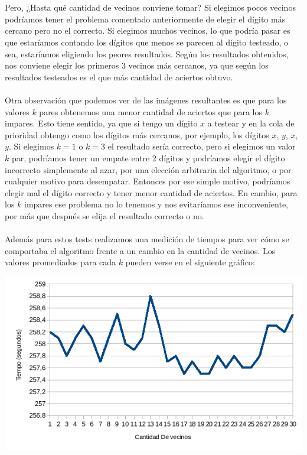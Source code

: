 \\ \\
Pero, ¿Hasta qué cantidad de vecinos conviene tomar?
Si elegimos pocos vecinos podríamos tener el problema comentado anteriormente de elegir el dígito más cercano pero no el correcto.
Si elegimos muchos vecinos, lo que podría pasar es que estaríamos contando los dígitos que menos se parecen al dígito testeado, o sea, estaríamos eligiendo los peores resultados.
Según los resultados obtenidos, nos conviene elegir los primeros 3 vecinos más cercanos, ya que según los resultados testeados es el que más cantidad de aciertos obtuvo.
\\ \\
Otra observación que podemos ver de las imágenes resultantes es que para los valores $k$ pares obtenemos una menor cantidad de aciertos que para los $k$ impares.
Esto tiene sentido, ya que si tengo un dígito $x$ a testear y en la cola de prioridad obtengo como los dígitos más cercanos, por ejemplo, los dígitos $x$, $y$, $x$, $y$.
Si elegimos $k=1$ o $k=3$ el resultado sería correcto, pero si elegimos un valor $k$ par, podríamos tener un empate entre 2 dígitos y podríamos elegir el dígito incorrecto simplemente al azar, por una elección arbitraria del algoritmo, o por cualquier motivo para desempatar. Entonces por ese simple motivo, podríamos elegir mal el dígito correcto y tener menor cantidad de aciertos. En cambio, para los $k$ impares ese problema no lo tenemos y nos evitaríamos ese inconveniente, por más que después se elija el resultado correcto o no.
\\ \\
Además para estos tests realizamos una medición de tiempos para ver cómo se comportaba el algoritmo frente a un cambio en la cantidad de vecinos. Los valores promediados para cada $k$ pueden verse en el siguiente gráfico:

\includegraphics[scale=0.55]{nuevosResultados/knn/knntemp.png}\\

